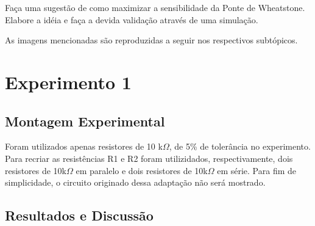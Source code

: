 \documentclass[a4paper,oneside,10pt]{article}
\begin{document}
\begin{enumerate}
	Faça uma sugestão de como maximizar a sensibilidade da Ponte de Wheatstone. Elabore a idéia e faça a devida validação através de uma simulação.
	
	
\end{enumerate}

As imagens mencionadas são reproduzidas a seguir nos respectivos subtópicos.





\section{Experimento 1}

\subsection{Montagem Experimental}

Foram utilizados apenas resistores de 10 k$\Omega$, de 5\% de tolerância no experimento. Para recriar as resistências R1 e R2 foram utilizidados, respectivamente, dois resistores de 10k$\Omega$ em paralelo e dois resistores de 10k$\Omega$ em série. Para fim de simplicidade, o circuito originado dessa adaptação não será mostrado.



\subsection{Resultados e Discussão}
\end{document}
